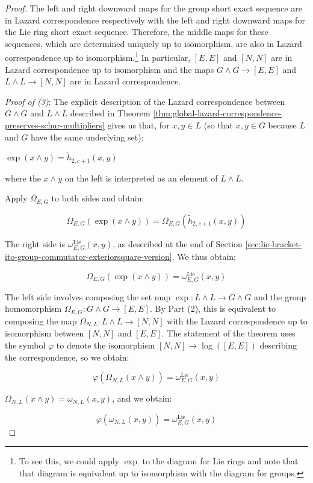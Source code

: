 \begin{proof}
  The left and right downward maps for the group short exact sequence
  are in Lazard correspondence respectively with the left and right
  downward maps for the Lie ring short exact sequence. Therefore, the
  middle maps for these sequences, which are determined uniquely up to
  isomorphism, are also in Lazard correspondence up to
  isomorphism.\footnote{To see this, we could apply $\exp$ to the
    diagram for Lie rings and note that that diagram is equivalent up
    to isomorphism with the diagram for groups.} In particular, $[E,E]$
  and $[N,N]$ are in Lazard correspondence up to isomorphism and the
  maps $G \wedge G \to [E,E]$ and $L \wedge L \to [N,N]$ are in
  Lazard correspondence.

  {\em Proof of (3)}: The explicit description of the Lazard
  correspondence between $G \wedge G$ and $L \wedge L$ described in
  Theorem
  \ref{thm:global-lazard-correspondence-preserves-schur-multipliers}
  gives us that, for $x,y \in L$ (so that $x,y \in G$ because $L$ and
  $G$ have the same underlying set):

  $\exp(x \wedge y) = \tilde{h}_{2,c+1}(x,y)$

  where the $x \wedge y$ on the left is interpreted as an element of
  $L \wedge L$.

  Apply $\Omega_{E,G}$ to both sides and obtain:

  $$\Omega_{E,G}(\exp(x \wedge y)) = \Omega_{E,G}(\tilde{h}_{2,c+1}(x,y))$$

  The right side is $\omega_{E,G}^{\text{Lie}}(x,y)$, as described at
  the end of Section
  \ref{sec:lie-bracket-ito-group-commutator-exteriorsquare-version}. We thus obtain:

  $$\Omega_{E,G}(\exp(x \wedge y)) = \omega_{E,G}^{\text{Lie}}(x,y)$$

  The left side involves composing the set map $\exp: L \wedge L \to G
  \wedge G$ and the group homomorphism $\Omega_{E,G}: G \wedge G
  \to[E,E]$. By Part (2), this is equivalent to composing the map
  $\Omega_{N,L}:L \wedge L \to [N,N]$ with the Lazard correspondence
  up to isomorphism between $[N,N]$ and $[E,E]$. The statement of the
  theorem uses the symbol $\varphi$ to denote the isomorphism $[N,N]
  \to \log([E,E])$ describing the correspondence, so we obtain:

  $$\varphi(\Omega_{N,L}(x \wedge y)) = \omega_{E,G}^{\text{Lie}}(x,y)$$

  $\Omega_{N,L}(x \wedge y) = \omega_{N,L}(x,y)$, and we obtain:

  $$\varphi(\omega_{N,L}(x,y)) = \omega_{E,G}^{\text{Lie}}(x,y)$$


\end{proof}
